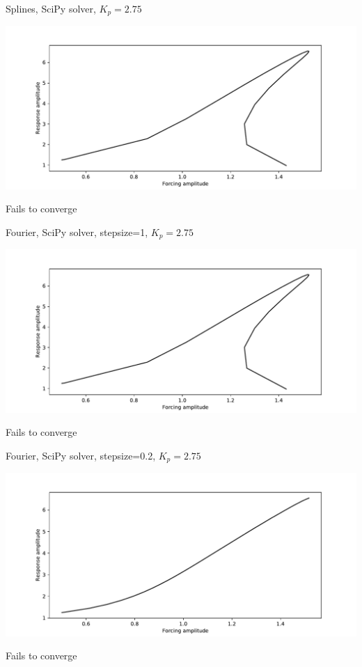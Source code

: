 \documentclass[presentation]{beamer}
\begin{document}
\begin{frame}[label={sec:org27f0ffc}]{Splines, SciPy solver, \(K_p=2.75\)}
\begin{center}
\includegraphics[width=.9\linewidth]{./kp2d75_transtime100_scipy_fourier.pdf}
\end{center}

Fails to converge
\end{frame}

\begin{frame}[label={sec:orge6eaa23}]{Fourier, SciPy solver, stepsize=1, \(K_p=2.75\)}
\begin{center}
\includegraphics[width=.9\linewidth]{./kp2d75_transtime100_scipy_fourier.pdf}
\end{center}

Fails to converge
\end{frame}

\begin{frame}[label={sec:orgf86b99a}]{Fourier, SciPy solver, stepsize=0.2, \(K_p=2.75\)}
\begin{center}
\includegraphics[width=.9\linewidth]{./kp2d75_transtime100_scipy_fourier_ss0d2.pdf}
\end{center}

Fails to converge
\end{frame}
\end{document}
